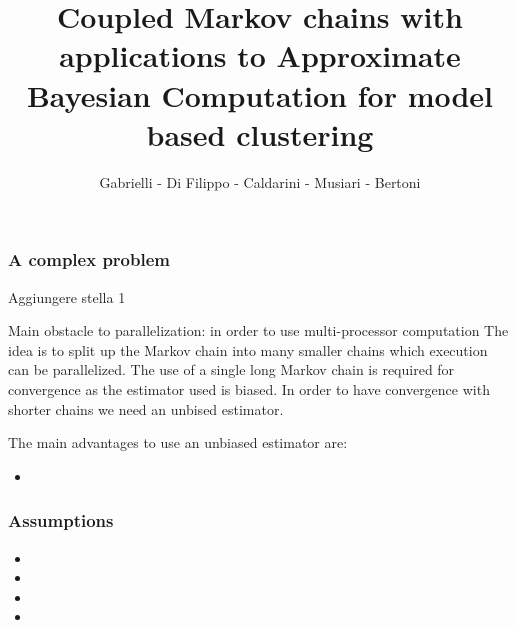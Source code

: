 \documentclass[9pt]{beamer}
\begin{document}
	\author{Gabrielli - Di Filippo - Caldarini - Musiari - Bertoni}
	\title{Coupled Markov chains with applications to Approximate Bayesian Computation for model based clustering}
	\begin{frame}[plain]
		\maketitle
	\end{frame}
	
	\begin{frame}
		\frametitle{A complex problem}
		
		\textit{}
		
	\end{frame}

	\begin{frame}
		Aggiungere stella 1
		
		Main obstacle to parallelization: in order to use multi-processor computation 
		The idea is to split up the Markov chain into many smaller chains which execution can be parallelized.
		The use of a single long Markov chain is required for convergence as the estimator used is biased. In order to have convergence with shorter chains we need an unbised estimator.
		
		The main advantages to use an unbiased estimator are:
		\begin{itemize}
			\item
		\end{itemize}
		         
	\end{frame}
	
	\begin{frame}
		\frametitle{Assumptions}
		\begin{itemize}
			\item
			\item
			\item
			\item
		\end{itemize}
	\end{frame}
\end{document}
